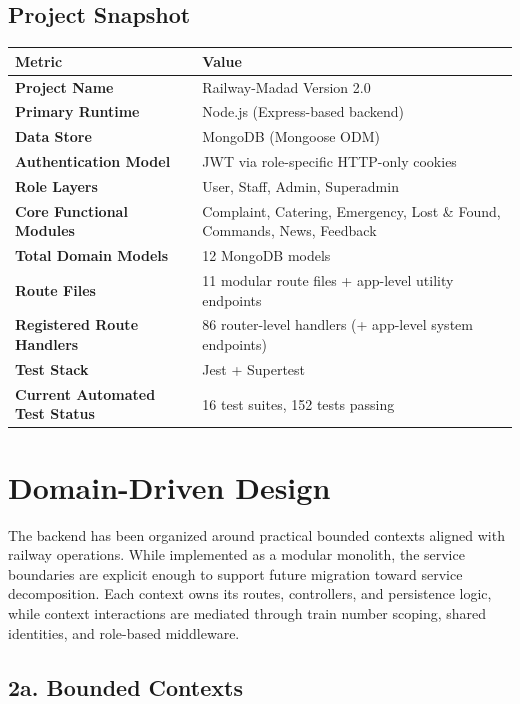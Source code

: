 \documentclass[12pt,a4paper]{report}
\begin{document}
\section{Project Snapshot}

\begin{table}[H]
\centering
\begin{tabularx}{\textwidth}{>{\bfseries}p{}Y}
\toprule
{}
\textcolor{TableHeaderText}{Metric} & \textcolor{TableHeaderText}{Value} \\
\midrule
Project Name & Railway-Madad Version 2.0 \\
Primary Runtime & Node.js (Express-based backend) \\
Data Store & MongoDB (Mongoose ODM) \\
Authentication Model & JWT via role-specific HTTP-only cookies \\
Role Layers & User, Staff, Admin, Superadmin \\
Core Functional Modules & Complaint, Catering, Emergency, Lost \& Found, Commands, News, Feedback \\
Total Domain Models & 12 MongoDB models \\
Route Files & 11 modular route files + app-level utility endpoints \\
Registered Route Handlers & 86 router-level handlers (+ app-level system endpoints) \\
Test Stack & Jest + Supertest \\
Current Automated Test Status & 16 test suites, 152 tests passing \\
\bottomrule
\end{tabularx}
\end{table}

\chapter{Domain-Driven Design}

The backend has been organized around practical bounded contexts aligned with railway operations. While implemented as a modular monolith, the service boundaries are explicit enough to support future migration toward service decomposition. Each context owns its routes, controllers, and persistence logic, while context interactions are mediated through train number scoping, shared identities, and role-based middleware.

\section{2a. Bounded Contexts}
\end{document}
